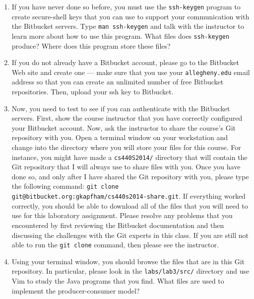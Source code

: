 \begin{enumerate}

  \item If you have never done so before, you must use the {\tt ssh-keygen} program to create secure-shell keys that you
    can use to support your communication with the Bitbucket servers.  Type {\tt man ssh-keygen} and talk with the
    instructor to learn more about how to use this program.  What files does {\tt ssh-keygen} produce?  Where does this
    program store these files?

  \item If you do not already have a Bitbucket account, please go to the Bitbucket Web site and create one --- make sure
    that you use your {\tt allegheny.edu} email address so that you can create an unlimited number of free Bitbucket
    repositories. Then, upload your ssh key to Bitbucket.

  \item Now, you need to test to see if you can authenticate with the Bitbucket servers.  First, show the course
    instructor that you have correctly configured your Bitbucket account.  Now, ask the instructor to share the course's
    Git repository with you.  Open a terminal window on your workstation and change into the directory where you will
    store your files for this course.  For instance, you might have made a {\tt cs440S2014/} directory that will contain
    the Git repository that I will always use to share files with you.  Once you have done so, and only after I have
    shared the Git repository with you, please type the following command: {\tt git clone
      git@bitbucket.org:gkapfham/cs440s2014-share.git}.  If everything worked correctly, you should be able to download
    all of the files that you will need to use for this laboratory assignment. Please resolve any problems that you
    encountered by first reviewing the Bitbucket documentation and then discussing the challenges with the Git experts
    in this class. If you are still not able to run the {\tt git clone} command, then please see the instructor.

  \item Using your terminal window, you should browse the files that are in this Git repository.  In particular, please
    look in the {\tt labs/lab3/src/} directory and use Vim to study the Java programs that you find. What files are used
    to implement the producer-consumer model?

\end{enumerate}

